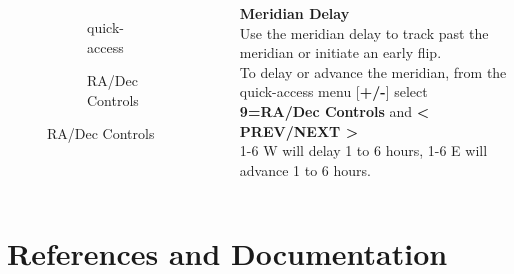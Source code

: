 
\begin{frame}[t]{\insertsubsectionhead}
    \begin{columns}[T]
      \begin{figure}[ht]
          \begin{subfigure}{0.67\textwidth}
          \caption{quick-access}
        \end{subfigure}
        \vspace{\fill}
        \begin{subfigure}{0.67\textwidth}
          \caption{RA/Dec Controls}
        \end{subfigure}
      \end{figure}
    \large
    \textbf{Meridian Delay} \\[0.25ex]

    Use the meridian delay to track past the meridian or initiate an early flip. \\[1ex]

    To delay or advance the meridian, from the quick-access menu
    [\textbf{+/-}] select \textbf{9=RA/Dec Controls} and \textbf{\textless
    PREV/NEXT \textgreater} \\[1ex]

    1-6 W will delay 1 to 6 hours, 1-6 E will advance 1 to 6 hours.
  \end{columns}
\end{frame}






\section{References and Documentation}

